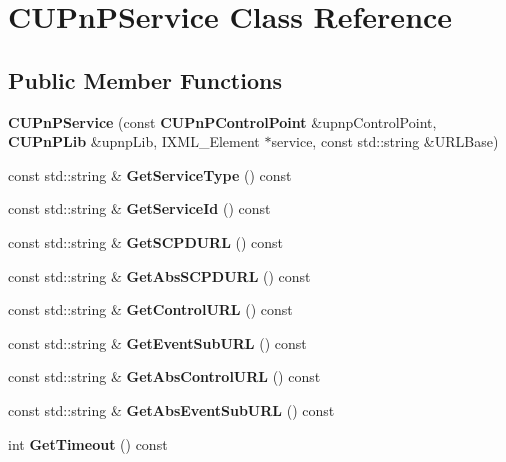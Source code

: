 \section{CUPnPService Class Reference}
\label{classCUPnPService}
\subsection*{Public Member Functions}
\begin{DoxyCompactItemize}
\item 
{\bfseries CUPnPService} (const {\bf CUPnPControlPoint} \&upnpControlPoint, {\bf CUPnPLib} \&upnpLib, IXML\_\-Element $\ast$service, const std::string \&URLBase)\label{classCUPnPService_a4b15ba5785f65cbd5a5a3d81797d5dd4}

\item 
const std::string \& {\bfseries GetServiceType} () const \label{classCUPnPService_a807897cccc47953af0c9a8b6d91fa091}

\item 
const std::string \& {\bfseries GetServiceId} () const \label{classCUPnPService_aa1cb46d876498f920b7aefb6321e3ecd}

\item 
const std::string \& {\bfseries GetSCPDURL} () const \label{classCUPnPService_aa418f408ebdb5123a6510e298df66bd6}

\item 
const std::string \& {\bfseries GetAbsSCPDURL} () const \label{classCUPnPService_a1bd650b269f1171c4eda160fa93db90a}

\item 
const std::string \& {\bfseries GetControlURL} () const \label{classCUPnPService_a6489bd9428e7f693d093f33971a5d324}

\item 
const std::string \& {\bfseries GetEventSubURL} () const \label{classCUPnPService_a7191934e588bf098f2d030d658bbe636}

\item 
const std::string \& {\bfseries GetAbsControlURL} () const \label{classCUPnPService_ad6dd04300a5915895b6464f6c41957f2}

\item 
const std::string \& {\bfseries GetAbsEventSubURL} () const \label{classCUPnPService_a8cf733916ce4520e42fcb327e248b173}

\item 
int {\bfseries GetTimeout} () const \label{classCUPnPService_a096768e24d0593847a4779f1c6e72e6f}


\end{DoxyCompactItemize}

